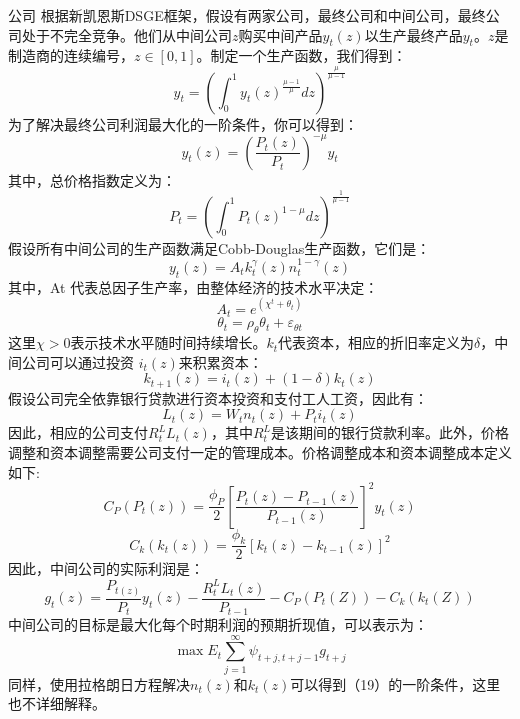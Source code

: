 \documentclass[withoutpreface,bwprint]{cumcmthesis} %
\begin{document}
{\heiti 公司} 根据新凯恩斯DSGE框架，假设有两家公司，最终公司和中间公司，最终公司处于不完全竞争。他们从中间公司$z$购买中间产品$y_t(z)$以生产最终产品$y_t$。$z$是制造商的连续编号，$z ∈ [0, 1]$。制定一个生产函数，我们得到：
\begin{equation}
	y_t=\left(\int_0^1 y_t(z)^{\frac{\mu-1}{\mu}} d z\right)^{\frac{\mu}{\mu-1}}
\end{equation}
为了解决最终公司利润最大化的一阶条件，你可以得到：
\begin{equation}
	y_t(z)=\left(\frac{P_t(z)}{P_t}\right)^{-\mu} y_t
\end{equation}
其中，总价格指数定义为：
\begin{equation}
	P_t=\left(\int_0^1 P_t(z)^{1-\mu} d z\right)^{\frac{1}{\mu-1}}
\end{equation}
假设所有中间公司的生产函数满足Cobb-Douglas生产函数，它们是：
\begin{equation}
	y_t(z)=A_t k_t^\gamma(z) n_t^{1-\gamma}(z)
\end{equation}
其中，At 代表总因子生产率，由整体经济的技术水平决定：
\begin{equation}
	A_t=e^{\left(\chi^t+\theta_t\right)} 
\end{equation}
\begin{equation}
	\theta_t=\rho_\theta \theta_t+\varepsilon_{\theta t}
\end{equation}
这里$χ > 0$表示技术水平随时间持续增长。$k_t$代表资本，相应的折旧率定义为$δ$，中间公司可以通过投资 $i_t(z)$来积累资本：
\begin{equation}
	k_{t+1}(z)=i_t(z)+(1-\delta) k_t(z)
\end{equation}
假设公司完全依靠银行贷款进行资本投资和支付工人工资，因此有：
\begin{equation}
	L_t(z)=W_t n_t(z)+P_t i_t(z)
\end{equation}
因此，相应的公司支付$R^L_tL_t(z)$，其中$R^L_t$是该期间的银行贷款利率。此外，价格调整和资本调整需要公司支付一定的管理成本。价格调整成本和资本调整成本定义如下:
\begin{equation}
	C_P\left(P_t(z)\right)=\frac{\phi_P}{2}\left[\frac{P_t(z)-P_{t-1}(z)}{P_{t-1}(z)}\right]^2 y_t(z) 
\end{equation}
\begin{equation}
	C_k\left(k_t(z)\right)=\frac{\phi_k}{2}\left[k_t(z)-k_{t-1}(z)\right]^2
\end{equation}
因此，中间公司的实际利润是：
\begin{equation}
	g_t(z)=\frac{P_{t(z)}}{P_t} y_t(z)-\frac{R_t^L L_t(z)}{P_{t-1}}-C_P\left(P_t(Z)\right)-C_k\left(k_t(Z)\right)
\end{equation}
中间公司的目标是最大化每个时期利润的预期折现值，可以表示为：
\begin{equation}
	\max E_t \sum_{j=1}^{\infty} \psi_{t+j, t+j-1} g_{t+j}
\end{equation}
同样，使用拉格朗日方程解决$n_t(z)$和$k_t(z)$可以得到（19）的一阶条件，这里也不详细解释。
\end{document}
